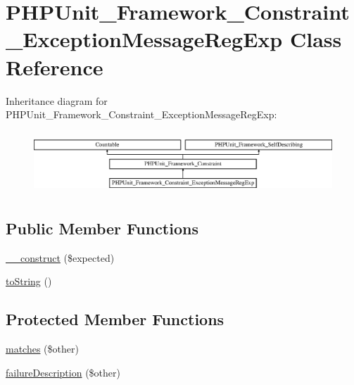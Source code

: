 \hypertarget{class_p_h_p_unit___framework___constraint___exception_message_reg_exp}{}\section{P\+H\+P\+Unit\+\_\+\+Framework\+\_\+\+Constraint\+\_\+\+Exception\+Message\+Reg\+Exp Class Reference}
\label{class_p_h_p_unit___framework___constraint___exception_message_reg_exp}
Inheritance diagram for P\+H\+P\+Unit\+\_\+\+Framework\+\_\+\+Constraint\+\_\+\+Exception\+Message\+Reg\+Exp\+:\begin{figure}[H]
\begin{center}
\leavevmode
\includegraphics[height=2.359551cm]{class_p_h_p_unit___framework___constraint___exception_message_reg_exp}
\end{center}
\end{figure}
\subsection*{Public Member Functions}
\begin{DoxyCompactItemize}
\item 
\mbox{\hyperlink{class_p_h_p_unit___framework___constraint___exception_message_reg_exp_a4432014bcb5b5900d382abfaa34d4a31}{\+\_\+\+\_\+construct}} (\$expected)
\item 
\mbox{\hyperlink{class_p_h_p_unit___framework___constraint___exception_message_reg_exp_a5558c5d549f41597377fa1ea8a1cefa3}{to\+String}} ()
\end{DoxyCompactItemize}
\subsection*{Protected Member Functions}
\begin{DoxyCompactItemize}
\item 
\mbox{\hyperlink{class_p_h_p_unit___framework___constraint___exception_message_reg_exp_a9c9c337de483bbdbb9fa249a6c7c9cc5}{matches}} (\$other)
\item 
\mbox{\hyperlink{class_p_h_p_unit___framework___constraint___exception_message_reg_exp_aaabb679273bfb812df4d81c283754a59}{failure\+Description}} (\$other)
\end{DoxyCompactItemize}
